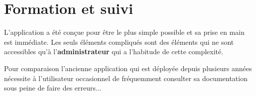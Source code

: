 \section{Formation et suivi}
\label{sec:formation}

L'application a été conçue pour être le plus simple possible et sa prise en main est immédiate.
Les seuls éléments compliqués sont des éléments qui ne sont accessibles qu'à l'\textbf{administrateur} qui a l'habitude de cette complexité.

Pour comparaison l'ancienne application qui est déployée depuis plusieurs années nécessite à l'utilisateur occasionnel de fréquemment consulter sa documentation sous peine de faire des erreurs...

